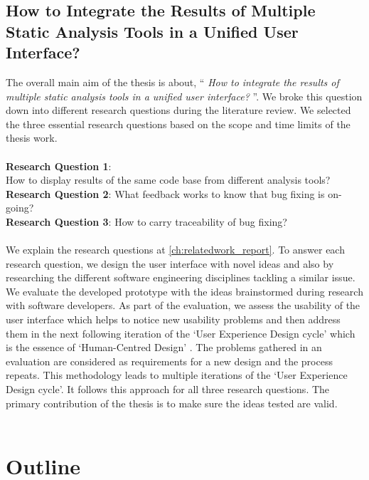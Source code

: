 \subsection{How to Integrate the Results of Multiple Static Analysis Tools in a Unified User Interface?}

The overall main aim of the thesis is about, “ \textit{How to integrate the results of multiple static analysis tools in a unified user interface?} ”. We broke this question down into different research questions during the literature review. We selected the three essential research questions based on the scope and time limits of the thesis work. \\ \\

\noindent\textbf{Research Question 1}: \\ How to display results of the same code base from different analysis tools? \\
\textbf{Research Question 2}: What feedback works to know that bug fixing is on-going? \\
\textbf{Research Question 3}: How to carry traceability of bug fixing? \\ \\

We explain the research questions at \autoref{ch:relatedwork_report}. To answer each research question, we design the user interface with novel ideas and also by researching the different software engineering disciplines tackling a similar issue. We evaluate the developed prototype with the ideas brainstormed during research with software developers. As part of the evaluation, we assess the usability \cite{usability} of the user interface which helps to notice new usability problems and then address them in the next following iteration of the ‘User Experience Design cycle’ \cite{UXD} which is the essence of ‘Human-Centred Design’ \cite{hcd}. The problems gathered in an evaluation are considered as requirements for a new design and the process repeats. This methodology leads to multiple iterations of the ‘User Experience Design cycle’. It follows this approach for all three research questions. The primary contribution of the thesis is to make sure the ideas tested are valid. \\ \\



\section{Outline}

